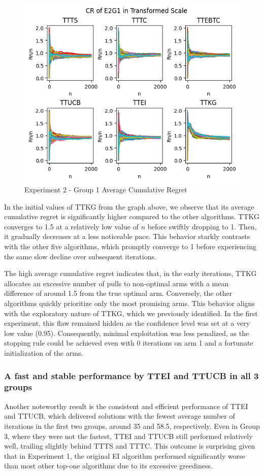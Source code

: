 \documentclass[a4paper, 12pt]{article}
\theoremstyle{definition}
\begin{document}
\begin{figure}[H] \centering
\includegraphics{figures/exp2_cr.png} 
\caption{Experiment 2 - Group 1 Average Cumulative Regret}
\label{figure:exp2_cr}
\end{figure}

In the initial values of TTKG from the graph above, we observe that its average cumulative regret is significantly higher compared to the other algorithms. TTKG converges to 1.5 at a relatively low value of $n$ before swiftly dropping to 1. Then, it gradually decreases at a less noticeable pace. This behavior starkly contrasts with the other five algorithms, which promptly converge to 1 before experiencing the same slow decline over subsequent iterations.

The high average cumulative regret indicates that, in the early iterations, TTKG allocates an excessive number of pulls to non-optimal arms with a mean difference of around 1.5 from the true optimal arm. Conversely, the other algorithms quickly prioritize only the most promising arms. This behavior aligns with the exploratory nature of TTKG, which we previously identified. In the first experiment, this flaw remained hidden as the confidence level was set at a very low value (0.95). Consequently, minimal exploitation was less penalized, as the stopping rule could be achieved even with 0 iterations on arm 1 and a fortunate initialization of the arms.

\subsubsection{A fast and stable performance by TTEI and TTUCB in all 3 groups}
Another noteworthy result is the consistent and efficient performance of TTEI and TTUCB, which delivered solutions with the fewest average number of iterations in the first two groups, around 35 and 58.5, respectively. Even in Group 3, where they were not the fastest, TTEI and TTUCB still performed relatively well, trailing slightly behind TTTS and TTTC. This outcome is surprising given that in Experiment 1, the original EI algorithm performed significantly worse than most other top-one algorithms due to its excessive greediness.
\end{document}
